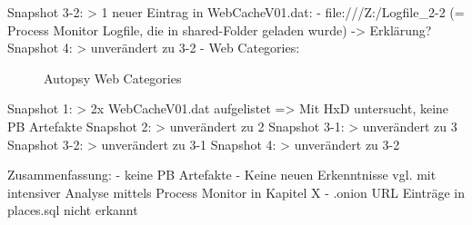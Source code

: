 	Snapshot 3-2:
		> 1 neuer Eintrag in WebCacheV01.dat:
			- file:///Z:/Logfile\_2-2 (= Process Monitor Logfile, die in shared-Folder geladen wurde) -> Erklärung?
	Snapshot 4:
		> unverändert zu 3-2
- Web Categories:
	\begin{figure}[h!]
		\centerline{}
		\label{chart:final-criteria}  
		\caption{Autopsy Web Categories}
	\end{figure}
	Snapshot 1:
		> 2x WebCacheV01.dat aufgelistet => Mit HxD untersucht, keine PB Artefakte
	Snapshot 2:
		> unverändert zu 2
	Snapshot 3-1:
		> unverändert zu 3
	Snapshot 3-2:
		> unverändert zu 3-1
	Snapshot 4:
		> unverändert zu 3-2
		
Zusammenfassung:
- keine PB Artefakte
- Keine neuen Erkenntnisse vgl. mit intensiver Analyse mittels Process Monitor in Kapitel X
- .onion URL Einträge in places.sql nicht erkannt


